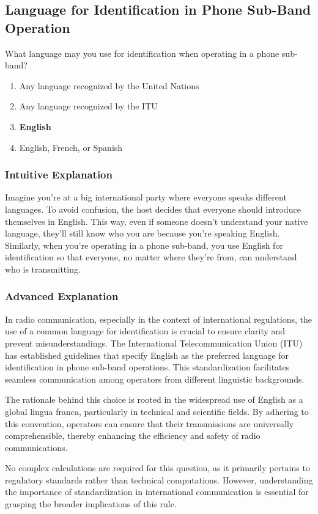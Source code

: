 \subsection{Language for Identification in Phone Sub-Band Operation}
\label{T1F04}

\begin{tcolorbox}[colback=gray!10!white,colframe=black!75!black,title=T1F04]
What language may you use for identification when operating in a phone sub-band?
\begin{enumerate}[label=\Alph*)]
    \item Any language recognized by the United Nations
    \item Any language recognized by the ITU
    \item \textbf{English}
    \item English, French, or Spanish
\end{enumerate}
\end{tcolorbox}

\subsubsection{Intuitive Explanation}
Imagine you're at a big international party where everyone speaks different languages. To avoid confusion, the host decides that everyone should introduce themselves in English. This way, even if someone doesn't understand your native language, they'll still know who you are because you're speaking English. Similarly, when you're operating in a phone sub-band, you use English for identification so that everyone, no matter where they're from, can understand who is transmitting.

\subsubsection{Advanced Explanation}
In radio communication, especially in the context of international regulations, the use of a common language for identification is crucial to ensure clarity and prevent misunderstandings. The International Telecommunication Union (ITU) has established guidelines that specify English as the preferred language for identification in phone sub-band operations. This standardization facilitates seamless communication among operators from different linguistic backgrounds. 

The rationale behind this choice is rooted in the widespread use of English as a global lingua franca, particularly in technical and scientific fields. By adhering to this convention, operators can ensure that their transmissions are universally comprehensible, thereby enhancing the efficiency and safety of radio communications. 

No complex calculations are required for this question, as it primarily pertains to regulatory standards rather than technical computations. However, understanding the importance of standardization in international communication is essential for grasping the broader implications of this rule.

